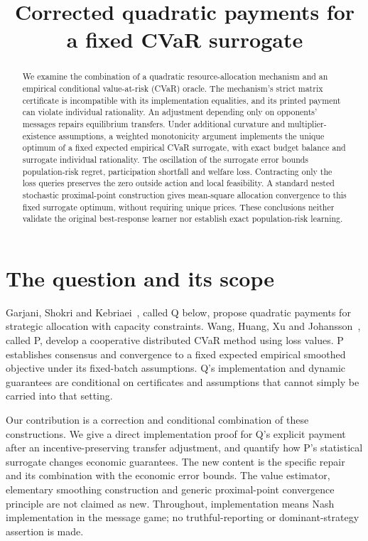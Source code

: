 \documentclass{article}
\title{Corrected quadratic payments for a fixed CVaR surrogate}
\author{}
\date{}
\begin{document}
\maketitle
\begin{abstract}
We examine the combination of a quadratic resource-allocation mechanism
and an empirical conditional value-at-risk (CVaR) oracle. The mechanism's
strict matrix certificate is incompatible with its implementation equalities,
and its printed payment can violate individual rationality. An adjustment
depending only on opponents' messages repairs equilibrium transfers.
Under additional curvature and multiplier-existence assumptions, a weighted
monotonicity argument implements the unique optimum of a fixed expected
empirical CVaR surrogate, with exact budget balance and surrogate individual
rationality. The oscillation of the surrogate error bounds population-risk
regret, participation shortfall and welfare loss. Contracting only the loss
queries preserves the zero outside action and local feasibility. A standard
nested stochastic proximal-point construction gives mean-square allocation
convergence to this fixed surrogate optimum, without requiring unique prices.
These conclusions neither validate the original best-response learner nor
establish exact population-risk learning.
\end{abstract}

\section{The question and its scope}
Garjani, Shokri and Kebriaei~\cite{Q}, called Q below, propose quadratic
payments for strategic allocation with capacity constraints. Wang, Huang,
Xu and Johansson~\cite{P}, called P, develop a cooperative distributed
CVaR method using loss values. P establishes consensus and convergence to a
fixed expected empirical smoothed objective under its fixed-batch assumptions.
Q's implementation and dynamic guarantees are conditional on certificates
and assumptions that cannot simply be carried into that setting.

Our contribution is a correction and conditional combination of these
constructions. We give a direct implementation proof for Q's explicit
payment after an incentive-preserving transfer adjustment, and quantify
how P's statistical surrogate changes economic guarantees. The new content
is the specific repair and its combination with the economic error bounds.
The value estimator, elementary smoothing construction and generic
proximal-point convergence principle are not claimed as new. Throughout,
implementation means Nash implementation in the message game; no
truthful-reporting or dominant-strategy assertion is made.
\end{document}
